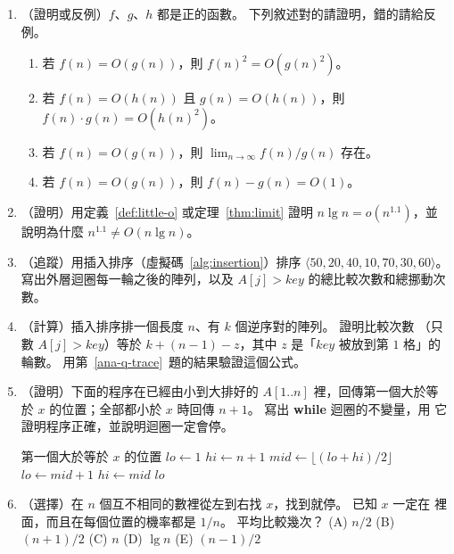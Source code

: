 \begin{enumerate}
\item （證明或反例）$f$、$g$、$h$ 都是正的函數。 下列敘述對的請證明，錯的請給反例。
\begin{enumerate}
\item 若 $f(n) = O(g(n))$，則 $f(n)^2 = O(g(n)^2)$。
\item 若 $f(n) = O(h(n))$ 且 $g(n) = O(h(n))$，則 $f(n) \cdot g(n) = O(h(n)^2)$。
\item 若 $f(n) = O(g(n))$，則 $\lim_{n \to \infty} f(n)/g(n)$ 存在。
\item 若 $f(n) = O(g(n))$，則 $f(n) - g(n) = O(1)$。
\end{enumerate}

\item （證明）用定義~\ref{def:little-o} 或定理~\ref{thm:limit} 證明
$n \lg n = o(n^{1.1})$，並說明為什麼 $n^{1.1} \ne O(n \lg n)$。

\item \label{ana-q-trace}（追蹤）用插入排序（虛擬碼~\ref{alg:insertion}）排序
$\langle 50, 20, 40, 10, 70, 30, 60 \rangle$。 寫出外層迴圈每一輪之後的陣列，以及
$A[j] > \mathit{key}$ 的總比較次數和總挪動次數。

\item （計算）插入排序排一個長度 $n$、有 $k$ 個逆序對的陣列。 證明比較次數
（只數 $A[j] > \mathit{key}$）等於 $k + (n - 1) - z$，其中 $z$ 是「$\mathit{key}$
被放到第 $1$ 格」的輪數。 用第~\ref{ana-q-trace}~題的結果驗證這個公式。

\item \label{ana-q-lower-bound}（證明）下面的程序在已經由小到大排好的 $A[1..n]$ 裡，回傳第一個大於等於
$x$ 的位置；全部都小於 $x$ 時回傳 $n + 1$。 寫出 \textbf{while} 迴圈的不變量，用
它證明程序正確，並說明迴圈一定會停。
\begin{pseudo}[unbreakable]{第一個大於等於 $x$ 的位置}
    \State $\mathit{lo} \gets 1$
    \State $\mathit{hi} \gets n + 1$
        \State $\mathit{mid} \gets \lfloor (\mathit{lo} + \mathit{hi}) / 2 \rfloor$
            \State $\mathit{lo} \gets \mathit{mid} + 1$
        \Else
            \State $\mathit{hi} \gets \mathit{mid}$
        \EndIf
    \EndWhile
    \State \Return $\mathit{lo}$
\EndFunction
\end{pseudo}

\item （選擇）在 $n$ 個互不相同的數裡從左到右找 $x$，找到就停。 已知 $x$ 一定在
裡面，而且在每個位置的機率都是 $1/n$。 平均比較幾次？
(A) $n/2$ \quad (B) $(n+1)/2$ \quad (C) $n$ \quad (D) $\lg n$ \quad (E) $(n-1)/2$


\end{enumerate}
